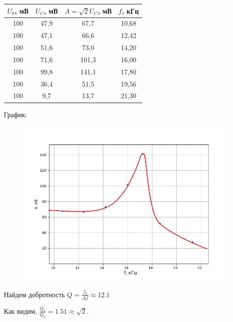 \documentclass[a4paper,12pt]{article} %
\begin{document}
\begin{table}[h!]
	\centering
	\begin{tabular}{|c|c|c|c|}
		\hline
		$U_0$, мВ & $U_C$, мВ & $A = \sqrt{2}U_C$, мВ & $f$, кГц \\ \hline
		100       & 47,9      & 67,7                  & 10,68   \\ \hline
		100       & 47,1      & 66,6                  & 12,42   \\ \hline
		100       & 51,6      & 73,0                  & 14,20   \\ \hline
		100       & 71,6      & 101,3                 & 16,00   \\ \hline
		100       & 99,8      & 141,1                 & 17,80   \\ \hline
		100       & 36,4      & 51,5                  & 19,56   \\ \hline
		100       & 9,7       & 13,7                  & 21,30   \\ \hline
	\end{tabular}
\end{table}

График:
\newpage

\begin{figure}[h!]
	\centering
	\includegraphics[scale=0.85]{Pictures/Рез2.png}
\end{figure}

Найдем добротность $Q = \frac{f_{\text{р}}}{\Delta f} \approx 12.1$

Как видим, $\frac{Q_1}{Q_2} = 1.51 \approx \sqrt{2}$.
\end{document}
